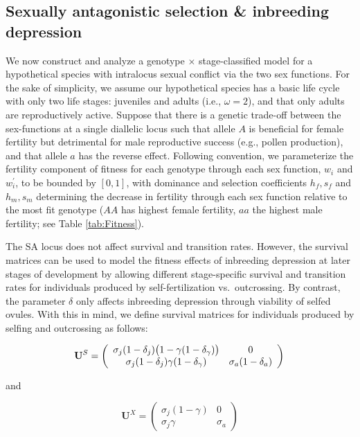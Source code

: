 \documentclass[11pt,draft]{article}
\def\mbf#1{\mathbf{#1}}
\begin{document}
\subsection*{Sexually antagonistic selection \& inbreeding depression} \label{sec:SAsel}

We now construct and analyze a genotype $\times$ stage-classified model for a hypothetical species with intralocus sexual conflict via the two sex functions. For the sake of simplicity, we assume our hypothetical species has a basic life cycle with only two life stages: juveniles and adults (i.e., $\omega = 2$), and that only adults are reproductively active. Suppose that there is a genetic trade-off between the sex-functions at a single diallelic locus such that allele $A$ is beneficial for female fertility but detrimental for male reproductive success (e.g., pollen production), and that allele $a$ has the reverse effect. Following convention, we parameterize the fertility component of fitness for each genotype through each sex function, $w_{i}$ and $w^{\prime}_{i}$, to be bounded by $[0,1]$, with dominance and selection coefficients $h_f, s_f$ and $h_m, s_m$ determining the decrease in fertility through each sex function relative to the most fit genotype ($AA$ has highest female fertility, $aa$ the highest male fertility; see Table \ref{tab:Fitness}). 

The SA locus does not affect survival and transition rates. However, the survival matrices can be used to model the fitness effects of inbreeding depression at later stages of development by allowing different stage-specific survival and transition rates for individuals produced by self-fertilization vs.~outcrossing. By contrast, the parameter $\delta$ only affects inbreeding depression through viability of selfed ovules. With this in mind, we define survival matrices for individuals produced by selfing and outcrossing as follows:
\begin{linenomath*}
\begin{equation} \label{eq:US}
	\mbf{U}^S = \left(
					\begin{array}{cc}
						\sigma_j (1 - \delta_j) \big(1 - \gamma (1 - \delta_{\gamma}) \big) & 0 \\
						\sigma_j (1 - \delta_j) \gamma (1 - \delta_{\gamma})      & \sigma_a (1 - \delta_a)
					\end{array}
				\right) \\
\end{equation}
\end{linenomath*}
\noindent and 
\begin{linenomath*}
\begin{equation}\label{eq:UX}
	\mbf{U}^X = \left(
					\begin{array}{cc}
						\sigma_j(1 - \gamma) & 0 \\
						\sigma_j \gamma      & \sigma_a
					\end{array}
				\right)
\end{equation}
\end{linenomath*}
\end{document}

